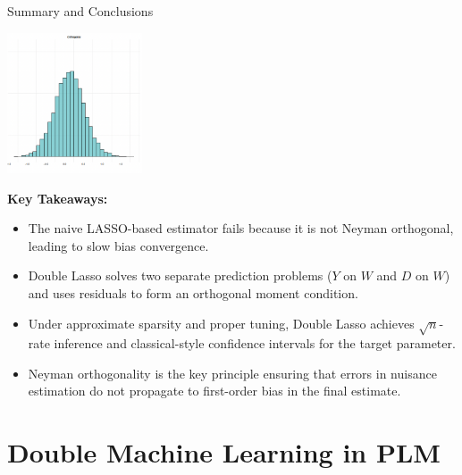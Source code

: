 \documentclass[xcolor=svgnames,t]{beamer}
\begin{document}
            
            \begin{frame}{Summary and Conclusions}
                \begin{center}
                    \includegraphics[width=0.3\textwidth]{Figures/orthogonal.png}
                    \end{center}
             \scriptsize       
            \textbf{Key Takeaways:}
            \begin{itemize}
                \item The naive LASSO-based estimator fails because it is not Neyman orthogonal, leading to slow bias convergence.
                \pause
                \item Double Lasso solves two separate prediction problems ($Y$ on $W$ and $D$ on $W$) and uses residuals to form an orthogonal moment condition.
                \pause
                \item Under approximate sparsity and proper tuning, Double Lasso achieves $\sqrt{n}$-rate inference and classical-style confidence intervals for the target parameter.
                \pause
                \item Neyman orthogonality is the key principle ensuring that errors in nuisance estimation do not propagate to first-order bias in the final estimate.
            \end{itemize}
        
            \end{frame}
   \section{Double Machine Learning in PLM}
   
\end{document}
